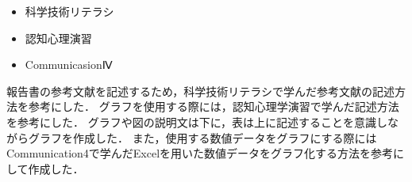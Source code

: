 \documentclass[../report]{subfiles}
\begin{document}
\begin{itemize}
    \item 科学技術リテラシ
    \item 認知心理演習
    \item CommunicasionⅣ
\end{itemize}
報告書の参考文献を記述するため，科学技術リテラシで学んだ参考文献の記述方法を参考にした．
グラフを使用する際には，認知心理学演習で学んだ記述方法を参考にした．
グラフや図の説明文は下に，表は上に記述することを意識しながらグラフを作成した．
また，使用する数値データをグラフにする際にはCommunication4で学んだExcelを用いた数値データをグラフ化する方法を参考にして作成した．
\end{document}
